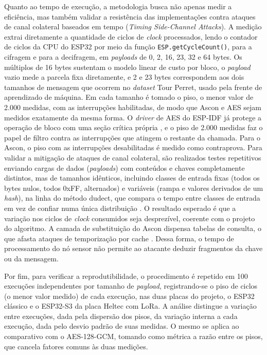 Quanto ao tempo de execução, a metodologia busca não apenas medir a eficiência, mas também validar a resistência das implementações contra ataques de canal colateral baseados em tempo (\textit{Timing Side-Channel Attacks}). A medição extrai diretamente a quantidade de ciclos de \textit{clock} processados, lendo o contador de ciclos da CPU do ESP32 por meio da função \texttt{ESP.getCycleCount()}, para a cifragem e para a decifragem, em \textit{payloads} de 0, 2, 16, 23, 32 e 64 bytes. Os múltiplos de 16 bytes sustentam o modelo linear de custo por bloco, o \textit{payload} vazio mede a parcela fixa diretamente, e 2 e 23 bytes correspondem aos dois tamanhos de mensagem que ocorrem no \textit{dataset} Tour Perret, usado pela frente de aprendizado de máquina. Em cada tamanho é tomado o piso, o menor valor de 2.000 medidas, com as interrupções habilitadas, de modo que Ascon e AES sejam medidos exatamente da mesma forma. O \textit{driver} de AES do ESP-IDF já protege a operação de bloco com uma seção crítica própria \cite{espressif2026idf}, e o piso de 2.000 medidas faz o papel de filtro contra as interrupções que atingem o restante da chamada. Para o Ascon, o piso com as interrupções desabilitadas é medido como contraprova. Para validar a mitigação de ataques de canal colateral, são realizados testes repetitivos enviando cargas de dados (\textit{payloads}) com conteúdos e chaves completamente distintos, mas de tamanhos idênticos, incluindo classes de entrada fixas (todos os bytes nulos, todos 0xFF, alternados) e variáveis (rampa e valores derivados de um \textit{hash}), na linha do método dudect, que compara o tempo entre classes de entrada em vez de confiar numa única distribuição \cite{reparaz2017dudect}. O resultado esperado é que a variação nos ciclos de \textit{clock} consumidos seja desprezível, coerente com o projeto do algoritmo. A camada de substituição do Ascon dispensa tabelas de consulta, o que afasta ataques de temporização por cache \cite{ascon_v12_spec}. Dessa forma, o tempo de processamento do nó sensor não permite ao atacante deduzir fragmentos da chave ou da mensagem.

Por fim, para verificar a reprodutibilidade, o procedimento é repetido em 100 execuções independentes por tamanho de \textit{payload}, registrando-se o piso de ciclos (o menor valor medido) de cada execução, nas duas placas do projeto, o ESP32 clássico e o ESP32-S3 da placa Heltec com LoRa. A análise distingue a variação entre execuções, dada pela dispersão dos pisos, da variação interna a cada execução, dada pelo desvio padrão de suas medidas. O mesmo se aplica ao comparativo com o AES-128-GCM, tomando como métrica a razão entre os pisos, que cancela fatores comuns às duas medições.

